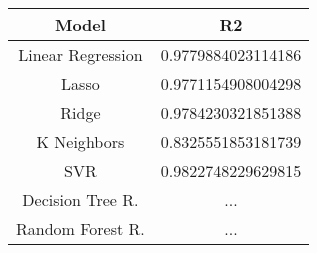 \documentclass[../../Report.tex]{subfiles}
\begin{document}
\begin{table}[H]
    \centering
    \begin{tabular}{|c|c|}
        \hline
        \textbf{Model}   & \textbf{R2}  \\
        \hline
        Linear Regression   &  0.9779884023114186    \\
        Lasso               & 0.9771154908004298     \\
        Ridge               & 0.9784230321851388     \\
        K Neighbors         & 0.8325551853181739     \\
        SVR                 & 0.9822748229629815    \\
        Decision Tree R.    & ...         \\
        Random Forest R.    & ...              \\
        \hline
    \end{tabular}
    
    \label{tab:classic_ml_results}
\end{table}
\end{document}
